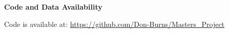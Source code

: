 \documentclass[a4paper, 11pt, hidelinks]{article} %
\begin{document}

	\nolinenumbers


%	
%	
%	
	
	\textbf{Code and Data Availability}

	Code is available at: \url{https://github.com/Don-Burns/Masters_Project}
	
	
	\newpage
	\linenumbers
	
	
	\printbibliography
	
	\nolinenumbers
	
	
	\newpage
	
	
	
\end{document}
